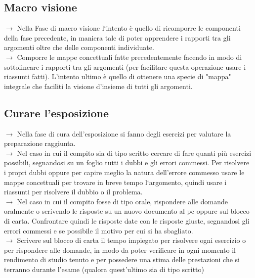 \documentclass[11pt,a4paper]{article}
\begin{document}
\subsection{Macro visione}
$\rightarrow$ Nella Fase di macro visione l`intento è quello di ricomporre le componenti della fase precedente, in maniera tale di poter apprendere i rapporti tra gli argomenti oltre che delle componenti individuate.\\
$\rightarrow$ Comporre le mappe concettuali fatte precedentemente facendo in modo di sottolineare i rapporti tra gli argomenti (per facilitare questa operazione usare i riassunti fatti). L'intento ultimo è quello di ottenere una specie di "mappa" integrale che faciliti la visione d'insieme di tutti gli argomenti. \\

\subsection{Curare l'esposizione}
$\rightarrow$ Nella fase di cura dell'esposizione si fanno degli esercizi per valutare la preparazione raggiunta.\\
$\rightarrow$ Nel caso in cui il compito sia di tipo scritto cercare di fare quanti più esercizi possibili, segnandosi su un foglio tutti i dubbi e gli errori commessi. Per risolvere i propri dubbi oppure per capire meglio la natura dell'errore commesso usare le mappe concettuali per trovare in breve tempo l`argomento, quindi usare i riassunti per risolvere il dubbio o il problema.\\
$\rightarrow$ Nel caso in cui il compito fosse di tipo orale, rispondere alle domande oralmente o scrivendo le risposte su un nuovo documento al pc oppure sul blocco di carta. Confrontare quindi le risposte date con le risposte giuste, segnandosi gli errori commessi e se possibile il motivo per cui si ha sbagliato.\\
$\rightarrow$ Scrivere sul blocco di carta il tempo impiegato per risolvere ogni esercizio o per rispondere alle domande, in modo da poter verificare in ogni momento il rendimento di studio tenuto e per possedere una stima delle prestazioni che si terranno durante l'esame (qualora quest'ultimo sia di tipo scritto)\\
\end{document}
